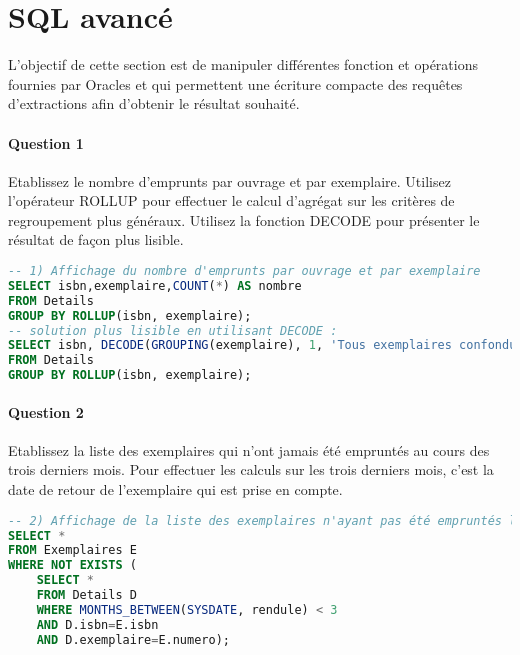 \documentclass[10pt, oneside]{article}
\begin{document}

\section{SQL avancé}

L'objectif de cette section est de manipuler différentes fonction et opérations fournies par Oracles et qui permettent une écriture compacte des requêtes d'extractions afin d'obtenir le résultat souhaité.



\paragraph{Question 1} Etablissez le nombre d'emprunts par ouvrage et par exemplaire. Utilisez l'opérateur ROLLUP pour effectuer le calcul d'agrégat sur les critères de regroupement plus généraux. Utilisez la fonction DECODE pour présenter le résultat de façon plus lisible.

\begin{lstlisting}[language=sql, title=Question 1, label=QIII1]
-- 1) Affichage du nombre d'emprunts par ouvrage et par exemplaire 
SELECT isbn,exemplaire,COUNT(*) AS nombre
FROM Details
GROUP BY ROLLUP(isbn, exemplaire);
-- solution plus lisible en utilisant DECODE :
SELECT isbn, DECODE(GROUPING(exemplaire), 1, 'Tous exemplaires confondus', exemplaire) AS exemplaire, COUNT(*) AS nombre
FROM Details
GROUP BY ROLLUP(isbn, exemplaire);
\end{lstlisting}


\paragraph{Question 2} Etablissez la liste des exemplaires qui n'ont jamais été empruntés au cours des trois derniers mois. Pour effectuer les calculs sur les trois derniers mois, c'est la date de retour de l'exemplaire qui est prise en compte.

\begin{lstlisting}[language=sql, title=Question 2, label=QIII2]
-- 2) Affichage de la liste des exemplaires n'ayant pas été empruntés lors des 3 derniers mois
SELECT *
FROM Exemplaires E
WHERE NOT EXISTS (
	SELECT *
	FROM Details D
	WHERE MONTHS_BETWEEN(SYSDATE, rendule) < 3
	AND D.isbn=E.isbn
	AND D.exemplaire=E.numero); 
\end{lstlisting}
\end{document}
